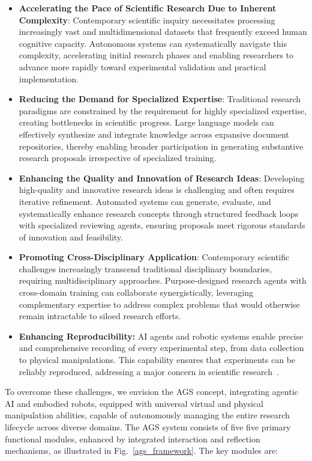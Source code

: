 \begin{itemize}
    \item \textbf{Accelerating the Pace of Scientific Research Due to Inherent Complexity}: Contemporary scientific inquiry necessitates processing increasingly vast and multidimensional datasets that frequently exceed human cognitive capacity. Autonomous systems can systematically navigate this complexity, accelerating initial research phases and enabling researchers to advance more rapidly toward experimental validation and practical implementation.
    \item \textbf{Reducing the Demand for Specialized Expertise}: Traditional research paradigms are constrained by the requirement for highly specialized expertise, creating bottlenecks in scientific progress. Large language models can effectively synthesize and integrate knowledge across expansive document repositories, thereby enabling broader participation in generating substantive research proposals irrespective of specialized training.
    \item \textbf{Enhancing the Quality and Innovation of Research Ideas}: Developing high-quality and innovative research ideas is challenging and often requires iterative refinement. Automated systems can generate, evaluate, and systematically enhance research concepts through structured feedback loops with specialized reviewing agents, ensuring proposals meet rigorous standards of innovation and feasibility.
    \item \textbf{Promoting Cross-Disciplinary Application}: Contemporary scientific challenges increasingly transcend traditional disciplinary boundaries, requiring multidisciplinary approaches. Purpose-designed research agents with cross-domain training can collaborate synergistically, leveraging complementary expertise to address complex problems that would otherwise remain intractable to siloed research efforts.
    \item \textbf{Enhancing Reproducibility:} AI agents and robotic systems enable precise and comprehensive recording of every experimental step, from data collection to physical manipulations. This capability ensures that experiments can be reliably reproduced, addressing a major concern in scientific research~\cite{10.7554/eLife.67995,Camerer2018EvaluatingTR}.
\end{itemize}

To overcome these challenges, we envision the AGS concept, integrating agentic AI and embodied robots, equipped with universal virtual and physical manipulation abilities, capable of autonomously managing the entire research lifecycle across diverse domains. The AGS system consists of five five primary  functional modules, enhanced by integrated interaction and reflection mechanisms, as illustrated in Fig.~\ref{ags_framework}. The key modules are:

